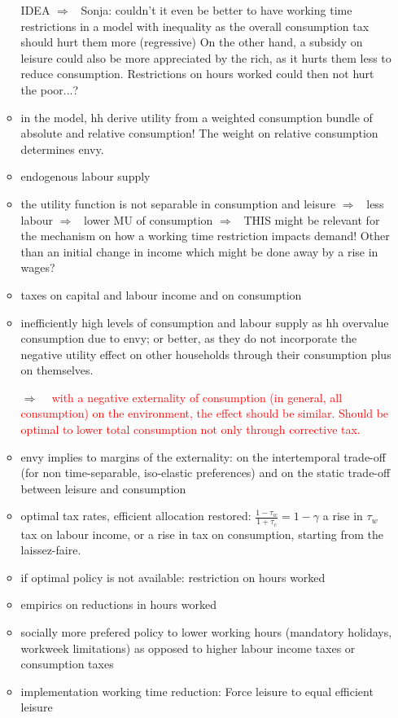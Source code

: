 \documentclass[12pt]{article}
\newcommand{\ar}{$\Rightarrow$ \ }
\newcommand{\tr}[1]{\textcolor{red}{#1}}
\begin{document}
\begin{itemize}
\begin{itemize}
IDEA \ar Sonja: couldn't it even be better to have working time restrictions in a model with inequality as the overall consumption tax should hurt them more (regressive) On the other hand, a subsidy on leisure could also be more appreciated by the rich, as it hurts them less to reduce consumption. Restrictions on hours worked could then not hurt the poor...?
\item in the model, hh derive utility from a weighted consumption bundle of absolute and relative consumption! The weight on relative consumption determines envy.
\item endogenous labour supply
\item the utility function is not separable in consumption and leisure \ar less labour \ar lower MU of consumption \ar THIS might be relevant for the mechanism on how a working time restriction impacts demand! Other than an initial change in income which might be done away by a rise in wages?
\item taxes on capital and labour income and on consumption
\item inefficiently high levels of consumption and labour supply as hh overvalue consumption due to envy; or better, as they do not incorporate the negative utility effect on other households through their consumption plus on themselves. 
\item[\ar] \tr{with a negative externality of consumption (in general, all consumption) on the environment, the effect should be similar. Should be optimal to lower total consumption not only through corrective tax. }
\item envy implies to margins of the externality: on the intertemporal trade-off (for non time-separable, iso-elastic preferences) and on the static trade-off between leisure and consumption
\item optimal tax rates, efficient allocation restored: $\frac{1-\tau_w}{1+\tau_c}=1-\gamma$ a rise in $\tau_w$ tax on labour income, or a rise in tax on consumption, starting from the laissez-faire. 
\item if optimal policy is not available: restriction on hours worked
\item empirics on reductions in hours worked
\item socially more prefered policy to lower working hours (mandatory holidays, workweek limitations) as opposed to higher labour income taxes or consumption taxes
\item implementation working time reduction: Force leisure to equal efficient leisure
\end{itemize}
\end{itemize}
\end{document}
